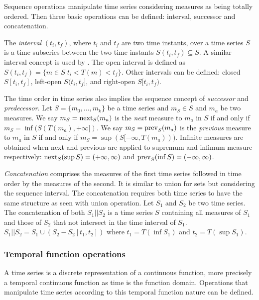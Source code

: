 Sequence operations manipulate time series considering measures as
being totally ordered. Then three basic operations can be defined:
interval, successor and concatenation.


The \emph{interval} $(t_i,t_f)$, where $t_i$ and $t_f$ are two time
instants, over a time series $S$ is a time subseries between the two
time instants $S(t_i,t_f) \subseteq S$. A similar interval concept
is used by \cite{last:hetland}. The open interval is defined as
$S(t_i,t_f)=\{m\in S | t_i<T(m)<t_f\}$. Other intervals can be
defined: closed $S[t_i,t_f]$, left-open $S(t_i,t_f]$, and right-open
$S[t_i,t_f)$.

The time order in time series also implies the sequence concept of
\emph{successor} and \emph{predecessor}.  Let $S=\{m_0, \ldots, m_k\}$
be a time series and $m_S\in S$ and $m_a$ be two measures. We say
$m_S=\operatorname*{next}_S(m_a)$ is the \emph{next} measure to $m_a$ in $S$ if and
only if $m_S=\inf(S(T(m_a),+\infty])$.  We say $m_S=\operatorname*{prev}_S(m_a)$ is
the \emph{previous} measure to $m_a$ in $S$ if and only if
$m_S=\sup(S[-\infty,T(m_a)))$. %
Infinite measures are obtained when next and previous are applied to
supremum and infimum measure respectively: $\operatorname*{next}_S(\sup
S)=(+\infty,\infty)$ and $\operatorname*{prev}_S(\inf S)=(-\infty,\infty)$.



\emph{Concatenation} comprises the measures of the first time series
followed in time order by the measures of the second. It is similar to
union for sets but considering the sequence interval. The
concatenation requires both time series to have the same structure as
seen with union operation.  Let $S_1$ and $S_2$ be two time series.
 The concatenation of both $S_1 || S_2$ is a time series $S$ containing
all measures of $S_1$ and those of $S_2$ that not intersect in the
time interval of $S_1$.  $S_1 || S_2 = S_1 \cup ( S_2 - S_2[t_1,t_2]
)$ where $t_1=T(\inf S_1)$ and $t_2=T(\sup S_1)$.



\subsubsection{Temporal function operations}
\label{sec:model:tfunc}

A time series is a discrete representation of a continuous function,
more precisely a temporal continuous function as time is the function
domain. Operations that manipulate time series according to this
temporal function nature can be defined.

